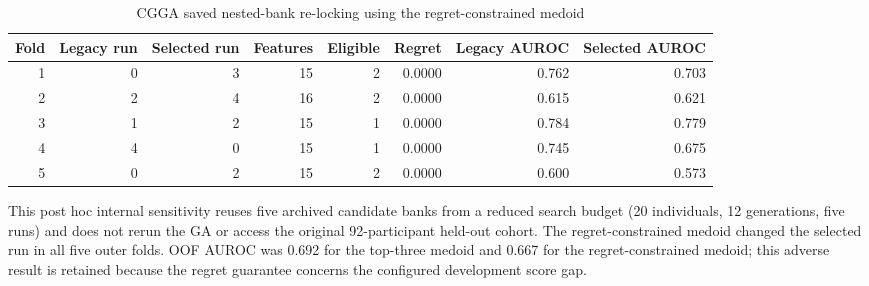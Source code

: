 \begin{table}[H]
\centering
\caption{CGGA saved nested-bank re-locking using the regret-constrained medoid}
\label{tab:supp18}
\scriptsize
\begin{tabular}{rrrrrrrr}
\toprule
Fold & Legacy run & Selected run & Features & Eligible & Regret & Legacy AUROC & Selected AUROC \\
\midrule
1 & 0 & 3 & 15 & 2 & 0.0000 & 0.762 & 0.703 \\
2 & 2 & 4 & 16 & 2 & 0.0000 & 0.615 & 0.621 \\
3 & 1 & 2 & 15 & 1 & 0.0000 & 0.784 & 0.779 \\
4 & 4 & 0 & 15 & 1 & 0.0000 & 0.745 & 0.675 \\
5 & 0 & 2 & 15 & 2 & 0.0000 & 0.600 & 0.573 \\
\bottomrule
\end{tabular}
\begin{minipage}{0.98\linewidth}\scriptsize\vspace{0.3em}
This post hoc internal sensitivity reuses five archived candidate banks from a reduced search budget (20 individuals, 12 generations, five runs) and does not rerun the GA or access the original 92-participant held-out cohort. The regret-constrained medoid changed the selected run in all five outer folds. OOF AUROC was 0.692 for the top-three medoid and 0.667 for the regret-constrained medoid; this adverse result is retained because the regret guarantee concerns the configured development score gap.
\end{minipage}
\end{table}
